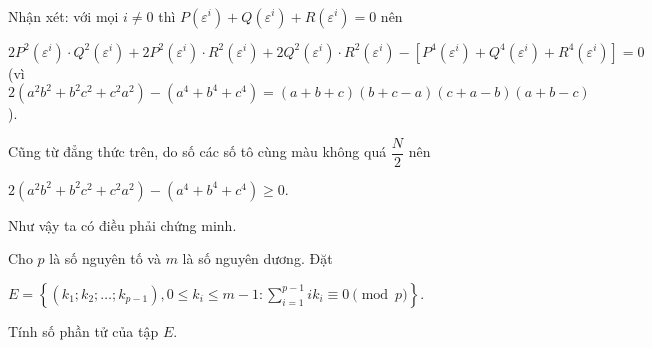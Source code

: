 \begin{bt}
{\begin{eqnarray*}
		\end{eqnarray*}
		Nhận xét: với mọi $i\ne 0$ thì $P(\varepsilon ^i)+Q(\varepsilon ^i)+R(\varepsilon ^i)=0$ nên 
		\begin{center}
			$2P^2(\varepsilon ^i)\cdot Q^2(\varepsilon ^i)+2P^2(\varepsilon ^i)\cdot R^2(\varepsilon ^i)+2Q^2(\varepsilon ^i)\cdot R^2(\varepsilon ^i)-\left[P^4(\varepsilon ^i)+Q^4(\varepsilon ^i)+R^4(\varepsilon ^i)\right]=0$\\
			(vì $2(a^2b^2+b^2c^2+c^2a^2)-(a^4+b^4+c^4)=(a+b+c)(b+c-a)(c+a-b)(a+b-c)$).
		\end{center}
		Cũng từ đẳng thức trên, do số các số tô cùng màu không quá $\dfrac{N}{2}$ nên 
		\begin{center}
			$2(a^2b^2+b^2c^2+c^2a^2)-(a^4+b^4+c^4)\ge 0.$
		\end{center}
		Như vậy ta có điều phải chứng minh.
	}
\end{bt}

\begin{bt}%
	Cho $p$ là số nguyên tố và $m$ là số nguyên dương. Đặt 
	\begin{center}
		$E=\left\{(k_1;k_2;\ldots;k_{p-1}),0\le k_i\le m-1:\displaystyle\sum\limits_{i=1}^{p-1}ik_i \equiv 0 \pmod{p} \right\}.$
	\end{center}
	Tính số phần tử của tập $E$.
\end{bt}

